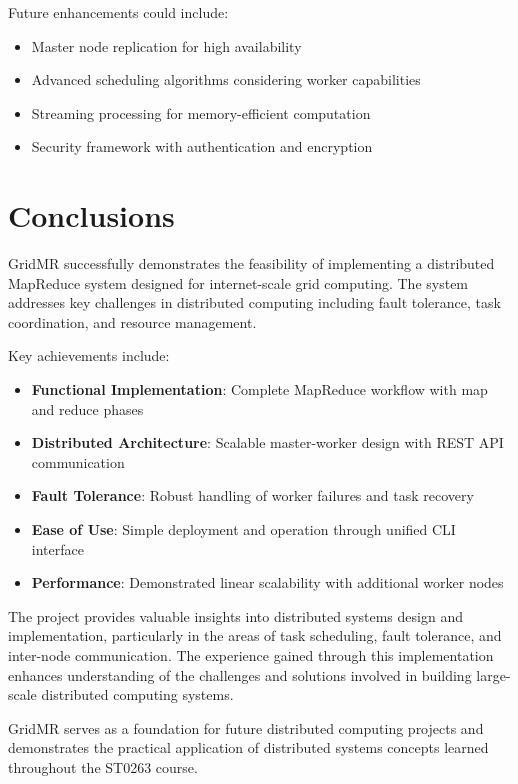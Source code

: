 \documentclass[11pt,letterpaper,oneside]{article}
\begin{document}
Future enhancements could include:

\begin{itemize}
    \item Master node replication for high availability
    \item Advanced scheduling algorithms considering worker capabilities
    \item Streaming processing for memory-efficient computation
    \item Security framework with authentication and encryption
\end{itemize}


\section{Conclusions}

GridMR successfully demonstrates the feasibility of implementing a distributed MapReduce system designed for internet-scale grid computing. The system addresses key challenges in distributed computing including fault tolerance, task coordination, and resource management.

Key achievements include:

\begin{itemize}
    \item \textbf{Functional Implementation}: Complete MapReduce workflow with map and reduce phases
    \item \textbf{Distributed Architecture}: Scalable master-worker design with REST API communication
    \item \textbf{Fault Tolerance}: Robust handling of worker failures and task recovery
    \item \textbf{Ease of Use}: Simple deployment and operation through unified CLI interface
    \item \textbf{Performance}: Demonstrated linear scalability with additional worker nodes
\end{itemize}

The project provides valuable insights into distributed systems design and implementation, particularly in the areas of task scheduling, fault tolerance, and inter-node communication. The experience gained through this implementation enhances understanding of the challenges and solutions involved in building large-scale distributed computing systems.

GridMR serves as a foundation for future distributed computing projects and demonstrates the practical application of distributed systems concepts learned throughout the ST0263 course.

\printbibliography
\end{document}
